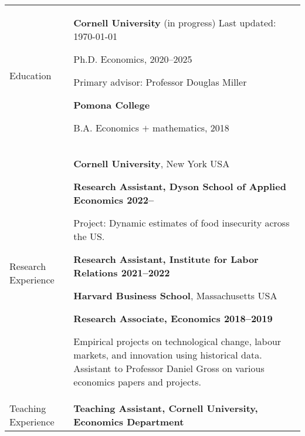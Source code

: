 \documentclass[letterpaper,11pt,oneside]{article}
\begin{document}
\noindent
\begin{tabular}[\textwidth]{p{} p{}}
    \Large{Education}
    & \textbf{Cornell University} (in progress)  \hfill Last updated: \today

    Ph.D. Economics, 2020--2025 
    
    Primary advisor: Professor Douglas Miller \vspace{0.1cm}
    
    \textbf{Pomona College}

    B.A. Economics $+$ mathematics, 2018 \vspace{0.2cm} \\
    
    
    
\Large{Research Experience}
    & \textbf{Cornell University}, New York USA
    
    \textbf{Research Assistant, Dyson School of Applied Economics \hfill 2022--}

    Project: Dynamic estimates of food insecurity across the US.
    
    \textbf{Research Assistant, Institute for Labor Relations \hfill 2021--2022}
    \vspace{0.2cm}
    

    \textbf{Harvard Business School}, Massachusetts USA
    
    \textbf{Research Associate, Economics \hfill 2018--2019}
    
    Empirical projects on technological change, labour markets, and innovation using historical data.
    Assistant to Professor Daniel Gross on various economics papers and projects.
    \vspace{0.2cm} \\

\Large{Teaching Experience}
    & \textbf{Teaching Assistant, Cornell University, Economics Department}
    

\end{tabular}
\end{document}
